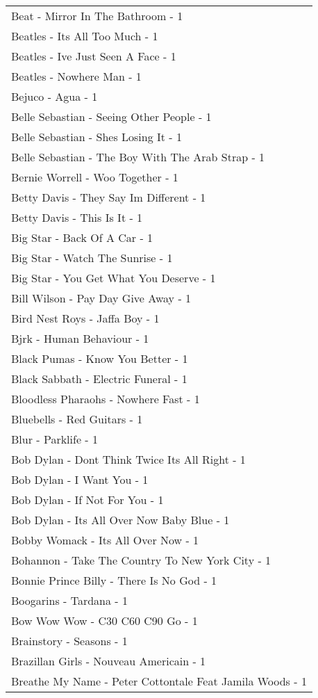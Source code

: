 \documentclass[
]{article}
\begin{document}
\begin{longtable}{l}
Beat - Mirror In The Bathroom - 1 \\ 
Beatles - Its All Too Much - 1 \\ 
Beatles - Ive Just Seen A Face - 1 \\ 
Beatles - Nowhere Man - 1 \\ 
Bejuco - Agua - 1 \\ 
Belle Sebastian - Seeing Other People - 1 \\ 
Belle Sebastian - Shes Losing It - 1 \\ 
Belle Sebastian - The Boy With The Arab Strap - 1 \\ 
Bernie Worrell - Woo Together - 1 \\ 
Betty Davis - They Say Im Different - 1 \\ 
Betty Davis - This Is It - 1 \\ 
Big Star - Back Of A Car - 1 \\ 
Big Star - Watch The Sunrise - 1 \\ 
Big Star - You Get What You Deserve - 1 \\ 
Bill Wilson - Pay Day Give Away - 1 \\ 
Bird Nest Roys - Jaffa Boy - 1 \\ 
Bjrk - Human Behaviour - 1 \\ 
Black Pumas - Know You Better - 1 \\ 
Black Sabbath - Electric Funeral - 1 \\ 
Bloodless Pharaohs - Nowhere Fast - 1 \\ 
Bluebells - Red Guitars - 1 \\ 
Blur - Parklife - 1 \\ 
Bob Dylan - Dont Think Twice Its All Right - 1 \\ 
Bob Dylan - I Want You - 1 \\ 
Bob Dylan - If Not For You - 1 \\ 
Bob Dylan - Its All Over Now Baby Blue - 1 \\ 
Bobby Womack - Its All Over Now - 1 \\ 
Bohannon - Take The Country To New York City - 1 \\ 
Bonnie Prince Billy - There Is No God - 1 \\ 
Boogarins - Tardana - 1 \\ 
Bow Wow Wow - C30 C60 C90 Go - 1 \\ 
Brainstory - Seasons - 1 \\ 
Brazillan Girls - Nouveau Americain - 1 \\ 
Breathe My Name - Peter Cottontale Feat Jamila Woods - 1 \\ 

\end{longtable}
\end{document}
